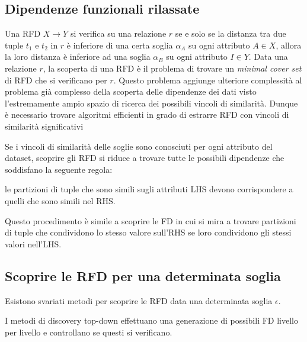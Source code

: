 \documentclass[11pt]{article}
\begin{document}
\subsection{Dipendenze funzionali rilassate}
Una RFD $X \rightarrow Y$ si verifica su una relazione $r$ se e solo se la distanza tra due tuple $t_1$ e $t_2$ in $r$ è inferiore di una certa soglia $\alpha_A$ su ogni attributo $A \in X$, allora la loro distanza è inferiore ad una soglia $\alpha_B$ su ogni attributo $I \in Y$. 
Data una relazione $r$, la scoperta di una RFD è il problema di trovare un \textit{minimal cover set} di RFD che si verificano per $r$. Questo problema aggiunge ulteriore complessità al problema già complesso della scoperta delle dipendenze dei dati visto l'estremamente ampio spazio di ricerca dei possibili vincoli di similarità. Dunque è necessario trovare algoritmi efficienti in grado di estrarre RFD con vincoli di similarità significativi

Se i vincoli di similarità delle soglie sono conosciuti per ogni attributo del dataset, scoprire gli RFD si riduce a trovare tutte le possibili dipendenze che soddisfano la seguente regola:
\begin{center}
le partizioni di tuple che sono simili sugli attributi LHS devono corrispondere a quelli che sono simili nel RHS.
\end{center}
Questo procedimento è simile a scoprire le FD in cui si mira a trovare partizioni di tuple che condividono lo stesso valore sull'RHS se loro condividono gli stessi valori nell'LHS. 

\subsection{Scoprire le RFD per una determinata soglia}
Esistono svariati metodi per scoprire le RFD data una determinata soglia $\epsilon$.

I metodi di discovery top-down effettuano una generazione di possibili FD livello per livello e controllano se questi si verificano.




\end{document}
